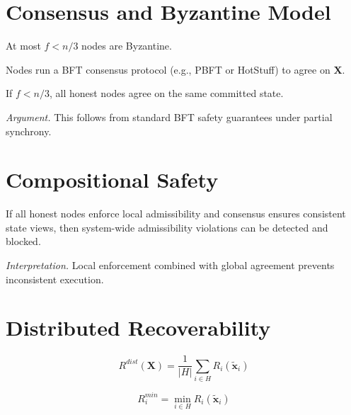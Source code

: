\documentclass[letterpaper, 10 pt, conference]{ieeeconf}
\begin{document}
\section{Consensus and Byzantine Model}

\begin{assumption}
At most $f < n/3$ nodes are Byzantine.
\end{assumption}

Nodes run a BFT consensus protocol (e.g., PBFT or HotStuff) to agree on $\mathbf{X}$.

\begin{theorem}[Safety]
If $f < n/3$, all honest nodes agree on the same committed state.
\end{theorem}

\textit{Argument.}
This follows from standard BFT safety guarantees under partial synchrony.

\section{Compositional Safety}

\begin{proposition}
If all honest nodes enforce local admissibility and consensus ensures consistent state views, then system-wide admissibility violations can be detected and blocked.
\end{proposition}

\textit{Interpretation.}
Local enforcement combined with global agreement prevents inconsistent execution.

\section{Distributed Recoverability}

\begin{definition}
\begin{equation}
R^{dist}(\mathbf{X}) = \frac{1}{|H|} \sum_{i \in H} R_i(\tilde{\mathbf{x}}_i)
\end{equation}
\end{definition}

\begin{definition}
\begin{equation}
R_i^{min} = \min_{i \in H} R_i(\tilde{\mathbf{x}}_i)
\end{equation}
\end{definition}
\end{document}
